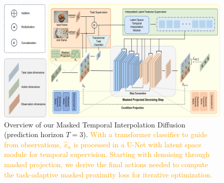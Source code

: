 \begin{figure}[t]
    \centering
\includegraphics[width=\textwidth,height=0.6\textheight,keepaspectratio]{figures/architecture1.png}
    \caption{Overview of our Masked Temporal Interpolation Diffusion (prediction horizon \( T=3 \)). \textcolor{orange}{With a transformer classifier to guide from observations, $\hat{x}_n$ is processed in a U-Net with latent space module for temporal supervision. Starting with denoising through masked projection, we derive the final actions needed to compute the task-adaptive masked proximity loss for iterative optimization. } }
    \label{fig:architecture}
\vspace{-4mm}
\end{figure}
